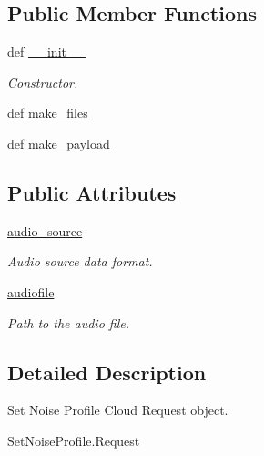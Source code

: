 \subsection*{Public Member Functions}
\begin{DoxyCompactItemize}
\item 
def \hyperlink{classRappCloud_1_1CloudMsgs_1_1SetNoiseProfile_1_1SetNoiseProfile_1_1Request_a35a11bfbd396e92746b5e3a75c292084}{\-\_\-\-\_\-init\-\_\-\-\_\-}
\begin{DoxyCompactList}\small\item\em Constructor. \end{DoxyCompactList}\item 
def \hyperlink{classRappCloud_1_1CloudMsgs_1_1SetNoiseProfile_1_1SetNoiseProfile_1_1Request_a200557c86095f99dbad6ff2f974bfc70}{make\-\_\-files}
\item 
def \hyperlink{classRappCloud_1_1CloudMsgs_1_1SetNoiseProfile_1_1SetNoiseProfile_1_1Request_af7ca5047a80242babc0141c59fb4922e}{make\-\_\-payload}
\end{DoxyCompactItemize}
\subsection*{Public Attributes}
\begin{DoxyCompactItemize}
\item 
\hyperlink{classRappCloud_1_1CloudMsgs_1_1SetNoiseProfile_1_1SetNoiseProfile_1_1Request_ad926ab70a457c02b21b5d5cefc682766}{audio\-\_\-source}
\begin{DoxyCompactList}\small\item\em Audio source data format. \end{DoxyCompactList}\item 
\hyperlink{classRappCloud_1_1CloudMsgs_1_1SetNoiseProfile_1_1SetNoiseProfile_1_1Request_afb321b03e5e5d0a37fa2236a282cb7ab}{audiofile}
\begin{DoxyCompactList}\small\item\em Path to the audio file. \end{DoxyCompactList}\end{DoxyCompactItemize}


\subsection{Detailed Description}
\begin{DoxyVerb}Set Noise Profile Cloud Request object.

SetNoiseProfile.Request
\end{DoxyVerb}
 

